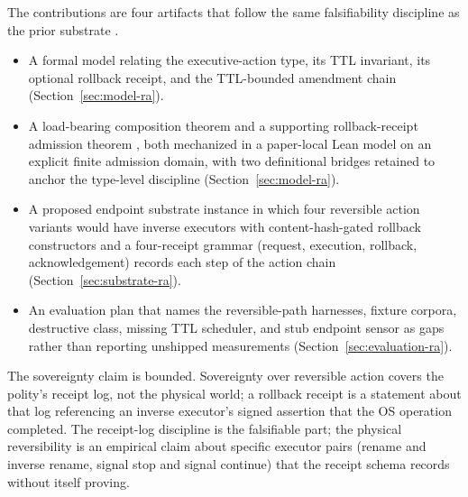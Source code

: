 The contributions are four artifacts that follow the same falsifiability
discipline as the prior substrate
\cite{programmableSovereigntyAnonymous}.

\begin{itemize}
  \item A formal model relating the executive-action type, its TTL
    invariant, its optional rollback receipt, and the TTL-bounded
    amendment chain (Section~\ref{sec:model-ra}).
  \item A load-bearing composition theorem
     and a
    supporting rollback-receipt admission theorem
    , both mechanized
    in a paper-local Lean model on an explicit finite admission domain,
    with two definitional bridges retained to anchor the type-level
    discipline (Section~\ref{sec:model-ra}).
  \item A proposed endpoint substrate instance in which four reversible
    action variants would have inverse executors with content-hash-gated
    rollback constructors and a four-receipt grammar (request, execution,
    rollback, acknowledgement) records each step of the action chain
    (Section~\ref{sec:substrate-ra}).
  \item An evaluation plan that names the reversible-path harnesses,
    fixture corpora, destructive class, missing TTL scheduler, and stub
    endpoint sensor as gaps rather than reporting unshipped measurements
    (Section~\ref{sec:evaluation-ra}).
\end{itemize}

The sovereignty claim is bounded. Sovereignty over reversible action
covers the polity's receipt log, not the physical world; a rollback
receipt is a statement about that log referencing an inverse executor's
signed assertion that the OS operation completed. The receipt-log
discipline is the falsifiable part; the physical reversibility is an
empirical claim about specific executor pairs (rename and inverse
rename, signal stop and signal continue) that the receipt schema
records without itself proving.
